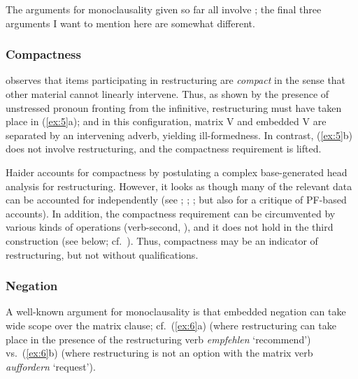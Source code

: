 \documentclass[output=paper]{langsci/langscibook}
\begin{document}
The arguments for monoclausality given so far all involve ; the final
three arguments I want to mention here are somewhat different.

\subsubsection{\label{m5}Compactness}

\cite{Haider:10} observes that items participating in restructuring are {\itshape compact} in the sense
that other material cannot linearly intervene. Thus, as shown by the
presence of unstressed pronoun fronting from the infinitive,
restructuring must have taken place in (\ref{ex:5}a); and in this
configuration, matrix V and embedded V are separated by an intervening adverb,
yielding ill-formedness. In contrast, (\ref{ex:5}b) does not involve
restructuring, and the compactness requirement is lifted.

\ea\label{ex:5} 
\z
\z

Haider accounts for compactness by postulating a complex base-generated head
analysis for restructuring. However, it looks as though many of the relevant
data can be accounted for independently (see \citealt{Buering&Hartmann:96};
\cite{Wurmbrand:07}; \cite[ch.~3]{Mueller:14:buf}; but also
\cite{Haider:16:com} for a critique of PF-based accounts). In addition, the
compactness requirement can be circumvented by various kinds of 
operations (verb-second, ), and it does not hold in the third
construction (see below; cf.\  \cite{Wurmbrand:07}). Thus, compactness may be an
indicator of restructuring, but not without qualifications.


\subsubsection{\label{m6}Negation}

A well-known argument for monoclausality is that embedded negation can take
wide scope over the matrix clause; cf.\ (\ref{ex:6}a) (where restructuring can
take place in the presence of the restructuring verb {\itshape empfehlen}
\enquote*{recommend}) vs.\ (\ref{ex:6}b) (where restructuring is not an option with the
matrix verb {\itshape auffordern} \enquote*{request}).
\end{document}
